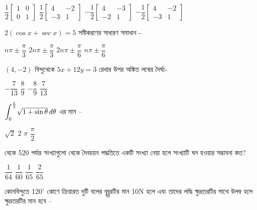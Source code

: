 \documentclass[addpoints]{exam}
\begin{document}
\begin{questions}
\begin{oneparchoices}
\choice $\dfrac{1}{2}\begin{bmatrix}
1 & 0\\
0 & 1 
\end{bmatrix} $
\choice $\dfrac{1}{2}\begin{bmatrix}
4 & -2\\
-3 & 1 
\end{bmatrix} $
\choice $-\dfrac{1}{2}\begin{bmatrix}
4 & -3\\
-2 & 1 
\end{bmatrix} $
\choice $-\dfrac{1}{2}\begin{bmatrix}
4 & -2\\
-3 & 1 
\end{bmatrix} $
\end{oneparchoices}

\question  $ 2(\cos x + \sec x) = 5 $ সমীকরণের সাধারণ সমাধান - 

\begin{oneparchoices}
\choice $ n\pi \pm \dfrac{\pi}{3} $
\choice $ 2n\pi \pm \dfrac{\pi}{3} $
\choice $ 2n\pi \pm \dfrac{\pi}{6} $
\choice $ n\pi \pm \dfrac{\pi}{6} $
\end{oneparchoices}

\question $ (4,-2) $ বিন্দুথেকে $ 5x+12y =3 $ রেখার উপর অঙ্কিত লম্বের দৈর্ঘ্য-

\begin{oneparchoices}
\choice $ -\dfrac{7}{13} $
\choice $ \dfrac{8}{9} $
\choice $ -\dfrac{8}{9} $
\choice $ \dfrac{7}{13} $
\end{oneparchoices}

\question $ \mathlarger{\int_{0}^{\frac{\pi}{2}}}\sqrt{1+\sin\theta}\, d\theta $ এর মান – 

\begin{oneparchoices}
\choice $ \sqrt{2} $
\choice $ 2 $
\choice $ \pi $
\choice  $ \dfrac{\pi}{2} $
\end{oneparchoices}

 থেকে 520 পর্যন্ত সংখ্যাগুলো থেকে দৈবচয়ন পদ্ধতিতে একটি সংখ্যা নেয়া হলে সংখ্যাটি  ঘন হওয়ার সম্ভাবনা কত?

\begin{oneparchoices}
\choice $ \dfrac{1}{64} $
\choice $ \dfrac{1}{60} $
\choice $ \dfrac{1}{65} $
\choice $ \dfrac{2}{65} $

\end{oneparchoices}

\question কোনবিন্দুতে 120$ ^{\circ} $ কোণে ক্রিয়ারত দুটি বলের বৃহ্ত্তরটির মান 10N হলে এবং তাদের লদ্ধি ক্ষুদ্রতরটির সাথে উলম্ব হলে ক্ষুদ্রতরটির মান হবে –


\end{questions}
\end{document}
